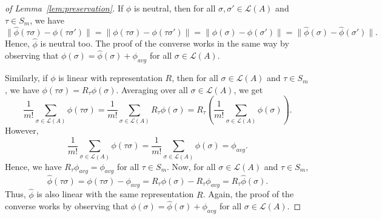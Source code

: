 \documentclass[prodmode,acmec]{ec-acmsmall}
\newcommand{\calL}{{\mathcal{L}}}
\newcommand{\rank}{{\calL(A)}}
\begin{document}
\begin{proof}[of Lemma~\ref{lem:preservation}]
If $\phi$ is neutral, then for all $\sigma,\sigma' \in \rank$ and $\tau \in S_m$, we have 
$$
\|\hat{\phi}(\tau \sigma)-\hat{\phi}(\tau \sigma')\| = \|\phi(\tau \sigma)-\phi(\tau \sigma')\| = \|\phi(\sigma)-\phi(\sigma')\| = \|\hat{\phi}(\sigma)-\hat{\phi}(\sigma')\|.
$$
Hence, $\hat{\phi}$ is neutral too. The proof of the converse works in the same way by observing that $\phi(\sigma) = \hat{\phi}(\sigma)+\phi_{avg}$ for all $\sigma \in \rank$. 

Similarly, if $\phi$ is linear with representation $R$, then for all $\sigma \in \rank$ and $\tau \in S_m$, we have $\phi(\tau \sigma) = R_{\tau}\phi(\sigma)$. Averaging over all $\sigma \in \rank$, we get 
$$
\frac{1}{m!} \sum_{\sigma \in \rank} \phi(\tau \sigma) = \frac{1}{m!}  \sum_{\sigma \in \rank} R_{\tau} \phi(\sigma) = R_{\tau} \left (\frac{1}{m!}  \sum_{\sigma \in \rank} \phi(\sigma) \right).
$$
However, 
$$
\frac{1}{m!}  \sum_{\sigma \in \rank} \phi(\tau \sigma) = \frac{1}{m!}  \sum_{\sigma \in \rank} \phi(\sigma) = \phi_{avg}.
$$
Hence, we have $R_{\tau}\phi_{avg} = \phi_{avg}$ for all $\tau \in S_m$. Now, for all $\sigma \in \rank$ and $\tau \in S_m$, 
$$
\hat{\phi}(\tau \sigma) = \phi(\tau \sigma) - \phi_{avg} = R_{\tau}\phi(\sigma) - R_{\tau}\phi_{avg} = R_{\tau}\hat{\phi}(\sigma).
$$
Thus, $\hat{\phi}$ is also linear with the same representation $R$. Again, the proof of the converse works by observing that $\phi(\sigma) = \hat{\phi}(\sigma)+\phi_{avg}$ for all $\sigma \in \rank$. 
\end{proof}
\end{document}
